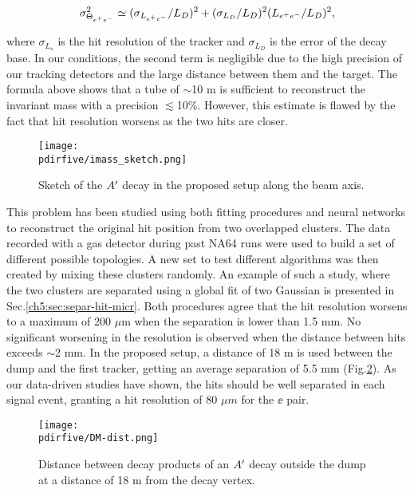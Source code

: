 \begin{equation}
  \sigma^2_{\Theta_{ e^+e^-}} \simeq (\sigma_{L_{e^+e^-}}  / L_D)^2 + (\sigma_{L_D} / L_D)^2(L_{e^+e^-} / L_D)^2,
  \label{eqn:thetaerr}
\end{equation}

where $\sigma_{L_{\ee}}$ is the hit resolution of the tracker and $\sigma_{L_D}$ is the error of the decay base. In our conditions, the second term is negligible due to the high precision of our tracking detectors and the large distance between them and the target. The formula above shows that a tube of $\sim$10 m is sufficient to reconstruct the invariant mass with a precision $\lesssim$10\%. However, this estimate is flawed by the fact that hit resolution worsens as the two hits are closer.

\begin{figure}[bth!]
  \centering
  \texttt{[image: \\pdirfive/imass\_sketch.png]}
  \caption[Invariant mass reconstruction sketch]{Sketch of the $A'$ decay in the proposed setup along the beam axis.}
  \label{fig:imass_sketch}
\end{figure}


This problem has been studied using both fitting procedures and neural networks to reconstruct the original hit position from two overlapped clusters. The data recorded with a gas detector during past NA64 runs were used to build a set of different possible topologies. A new set to test different algorithms was then created by mixing these clusters randomly. An example of such a study, where the two clusters are separated using a global fit of two Gaussian is presented in Sec.\ref{ch5:sec:separ-hit-micr}. Both procedures agree that the hit resolution worsens to a maximum of 200 $\mu$m when the separation is lower than 1.5 mm. No significant worsening in the resolution is observed when the distance between hits exceeds $\sim$2 mm. In the proposed setup, a distance of 18 m is used between the dump and the first tracker, getting an average separation of 5.5 mm (Fig.\ref{fig:dm_dist1}). As our data-driven studies have shown, the hits should be well separated in each signal event, granting a hit resolution of 80 $\mu m$ for the $\ee$ pair.

\begin{figure}[tbh!]
  \centering
  \texttt{[image: \\pdirfive/DM-dist.png]}
  \caption[Distance of the decay products of X17 in the 2021 setup]{Distance between decay products of an $A'$ decay outside the dump at a distance of 18 m from the decay vertex.}
  \label{fig:dm_dist1}
\end{figure}

